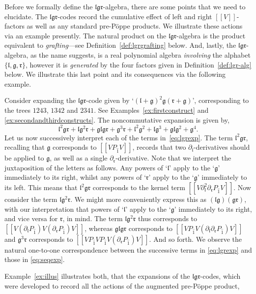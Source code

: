 \documentclass[5p,twocolumn]{elsarticle}
\newcommand*{\pa}{{\partial}}
\newcommand*{\lb}{[\![}
\newcommand*{\rb}{]\!]}
\newcommand*{\el}{\mathfrak l}
\newcommand*{\gl}{\mathfrak g}
\newcommand*{\rl}{\mathfrak r}
\begin{document}
Before we formally define the $\el\gl\rl$-algebra, there are some points that we need to elucidate.
The $\el\gl\rl$-codes record the cumulative effect of left and right $\lb V\rb$-factors as well as any standard pre-P\"oppe products.
We illustrate these actions via an example presently.
The natural product on the $\el\gl\rl$-algebra is the product equivalent to \emph{grafting}---see Definition~\ref{def:lgrgrafting} below.
And, lastly, the $\el\gl\rl$-algebra, as the name suggests, is a real polynomial algebra \emph{involving} the alphabet $\{\el,\gl,\rl\}$,
however it is \emph{generated} by the four factors given in Definition~\ref{def:lgr-alg} below.
We illustrate this last point and its consequences via the following example.
%
\begin{example}\label{ex:illus}
Consider expanding the $\el\gl\rl$-code given by `$(\el+\gl)^2\gl(\rl+\gl)$', corresponding to the trees $1243$, $1342$ and $2341$. See Examples~\ref{ex:firstconstruct} and \ref{ex:secondandthirdconstructs}.
The noncommutative expansion is given by,
\begin{equation}
\el^2\gl\rl+\el\gl^2\rl+\gl\el\gl\rl+\gl^3\rl+\el^2\gl^2+\el\gl^3+\gl\el\gl^2+\gl^4. \label{eq:lgrexp}
\end{equation}
Let us now successively interpret each of the terms in~\eqref{eq:lgrexp}.
The term $\el^2\gl\rl$, recalling that $\gl$ corresponds to $\lb VP_{\hat 1}V\rb$, records that two $\pa_{\el}$-derivatives should be applied to $\gl$, as well as a single $\pa_{\rl}$-derivative.
Note that we interpret the juxtaposition of the letters as follows.
Any powers of `$\el$' apply to the `$\gl$' immediately to its right, whilst any powers of `$\rl$'  apply to the `$\gl$' immediately to its left.
This means that $\el^2\gl\rl$ corresponds to the kernel term $\lb V\pa_{\el}^2\pa_{\rl}P_{\hat 1}V\rb$.
Now consider the term $\el\gl^2\rl$. We might more conveniently express this as $(\el\gl)(\gl\rl)$, with our interpretation that powers of `$\el$' apply to the `$\gl$' immediately to its right, and vice versa for $\rl$, in mind. 
The term $\el\gl^2\rl$ thus corresponds to $\lb V(\pa_{\el}P_{\hat 1})V(\pa_{\rl}P_{\hat 1})V\rb$, whereas $\gl\el\gl\rl$ corresponds to $\lb VP_{\hat 1}V(\pa_{\el}\pa_{\rl}P_{\hat 1})V\rb$ and
$\gl^3\rl$ corresponds to $\lb VP_{\hat 1}VP_{\hat 1}V(\pa_{\rl}P_{\hat 1})V\rb$. And so forth.
We observe the natural one-to-one correspondence between the successive terms in \eqref{eq:lgrexp} and those in \eqref{eq:seqexp}.
\end{example}
%
Example~\ref{ex:illus} illustrates both, that the expansions of the $\el\gl\rl$-codes, which were developed to record all the actions of the augmented pre-P\"oppe product, 
\end{document}
